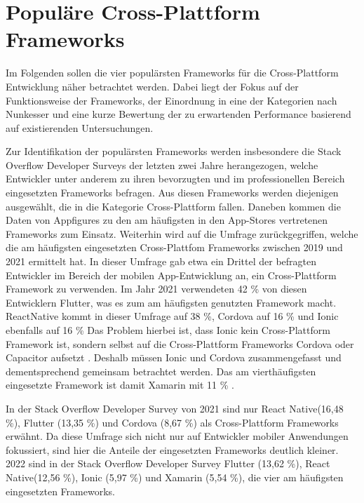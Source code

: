 \chapter{Populäre Cross-Plattform Frameworks}
\label{ch:Frameworks}

Im Folgenden sollen die vier populärsten Frameworks für die Cross-Plattform Entwicklung näher betrachtet werden.
Dabei liegt der Fokus auf der Funktionsweise der Frameworks, der Einordnung in eine der Kategorien nach Nunkesser und eine kurze Bewertung der zu erwartenden Performance basierend auf existierenden Untersuchungen.

Zur Identifikation der populärsten Frameworks werden insbesondere die Stack Overflow Developer Surveys der letzten zwei Jahre \cite{Stackoverflow_2021} \cite{Stackoverflow_2022} herangezogen, welche Entwickler unter anderem zu ihren bevorzugten und im professionellen Bereich eingesetzten Frameworks befragen.
Aus diesen Frameworks werden diejenigen ausgewählt, die in die Kategorie Cross-Plattform fallen.
Daneben kommen die Daten von Appfigures zu den am häufigsten in den App-Stores vertretenen Frameworks \cite{Appfigures_TopSDKs} zum Einsatz.
Weiterhin wird auf die Umfrage \cite{Statista_UsedCrossPlatformFrameworks} zurückgegriffen, welche die am häufigsten eingesetzten Cross-Plattfom Frameworks zwischen 2019 und 2021 ermittelt hat.
In dieser Umfrage gab etwa ein Drittel der befragten Entwickler im Bereich der mobilen App-Entwicklung an, ein Cross-Plattform Framework zu verwenden.
Im Jahr 2021 verwendeten 42 \% von diesen Entwicklern Flutter, was es zum am häufigsten genutzten Framework macht.
ReactNative kommt in dieser Umfrage auf 38 \%, Cordova auf 16 \% und Ionic ebenfalls auf 16 \%
Das Problem hierbei ist, dass Ionic kein Cross-Plattform Framework ist, sondern selbst auf die Cross-Plattform Frameworks Cordova oder Capacitor aufsetzt \cite{Ionic_Docs}.
Deshalb müssen Ionic und Cordova zusammengefasst und dementsprechend gemeinsam betrachtet werden.
Das am vierthäufigsten eingesetzte Framework ist damit Xamarin mit 11 \% \cite{Statista_UsedCrossPlatformFrameworks}.

In der Stack Overflow Developer Survey von 2021 \cite{Stackoverflow_2021} sind nur React Native(16,48 \%), Flutter (13,35 \%) und Cordova (8,67 \%) als Cross-Plattform Frameworks erwähnt.
Da diese Umfrage sich nicht nur auf Entwickler mobiler Anwendungen fokussiert, sind hier die Anteile der eingesetzten Frameworks deutlich kleiner.
2022 sind in der Stack Overflow Developer Survey \cite{Stackoverflow_2022} Flutter (13,62 \%), React Native(12,56 \%), Ionic (5,97 \%) und Xamarin (5,54 \%), die vier am häufigsten eingesetzten Frameworks.

